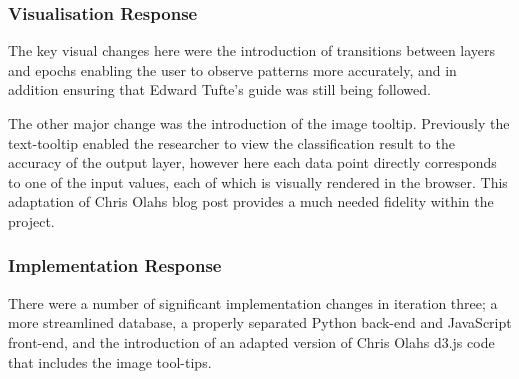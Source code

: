 \documentclass[a4paper,11pt,titlepage]{article}
\begin{document}
		\subsubsection{Visualisation Response}
		The key visual changes here were the introduction of transitions between layers and epochs enabling the user to observe patterns more accurately, and in addition ensuring that Edward Tufte's guide was still being followed.
		\par 
		The other major change was the introduction of the image tooltip. Previously the text-tooltip enabled the researcher to view the classification result to the accuracy of the output layer, however here each data point directly corresponds to one of the input values, each of which is visually rendered in the browser. This adaptation of Chris Olahs blog post provides a much needed fidelity within the project.		
	\subsubsection{Implementation Response}
	There were a number of significant implementation changes in iteration three; a more streamlined database, a properly separated Python back-end and JavaScript front-end, and the introduction of an adapted version of Chris Olahs \cite{Olah2014c} d3.js code that includes the image tool-tips.
	
\end{document}

